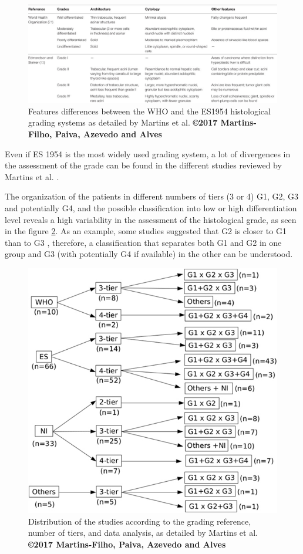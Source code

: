 \begin{figure}[th!]
\centering
\includegraphics[width=0.9\linewidth]{images/martins2017_table1}
\caption{Features differences between the WHO and the ES1954 histological grading systems as detailed by Martins et al. \cite{Martins2017} \textbf{©2017 Martins-Filho, Paiva, Azevedo and Alves}}
\label{fig:martins2017_table1}
\end{figure}

Even if ES 1954 is the most widely used grading system, a lot of
divergences in the assessment of the grade can be found in the different
studies reviewed by Martins et al. \cite{Martins2017}.

The organization of the patients in different numbers of tiers (3 or 4)
G1, G2, G3 and potentially G4, and the possible classification into low
or high differentiation level reveals a high variability in the
assessment of the histological grade, as seen in the figure \ref{fig:martins2017_figure2}.
As an example, some studies suggested that G2 is closer to G1 than to G3 \cite{Han2013,Zucman-Rossi2015}, therefore, a classification that separates
both G1 and G2 in one group and G3 (with potentially G4 if available) in
the other can be understood.\\


\begin{figure}[th!]
\centering
\includegraphics[width=0.5\linewidth]{images/martins2017_figure2}
\caption{Distribution of the studies according to the grading reference, number of tiers, and data analysis, as detailed by Martins et al. \cite{Martins2017} \textbf{©2017 Martins-Filho, Paiva, Azevedo and Alves}}
\label{fig:martins2017_figure2}
\end{figure}



